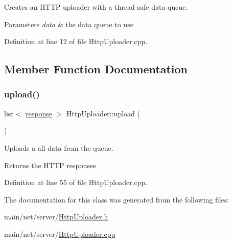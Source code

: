 Creates an H\+T\+TP uploader with a thread-\/safe data queue.


\begin{DoxyParams}{Parameters}
{\em data} & the data queue to use \\
\hline
\end{DoxyParams}


Definition at line 12 of file Http\+Uploader.\+cpp.


\begin{DoxyCode}{0}

\end{DoxyCode}


\subsection{Member Function Documentation}
\mbox{\label{classHttpUploader_ad97b880d70d66d826b832d1273a73ab1}} 
\subsubsection{\texorpdfstring{upload()}{upload()}}
{\footnotesize\ttfamily list$<$ \mbox{\hyperlink{structresponse}{response}} $>$ Http\+Uploader\+::upload (\begin{DoxyParamCaption}{ }\end{DoxyParamCaption})}

Uploads a all data from the queue.

\begin{DoxyReturn}{Returns}
the H\+T\+TP responses 
\end{DoxyReturn}


Definition at line 55 of file Http\+Uploader.\+cpp.


\begin{DoxyCode}{0}

\end{DoxyCode}


The documentation for this class was generated from the following files\+:\begin{DoxyCompactItemize}
\item 
main/net/server/\mbox{\hyperlink{HttpUploader_8h}{Http\+Uploader.\+h}}\item 
main/net/server/\mbox{\hyperlink{HttpUploader_8cpp}{Http\+Uploader.\+cpp}}\end{DoxyCompactItemize}

